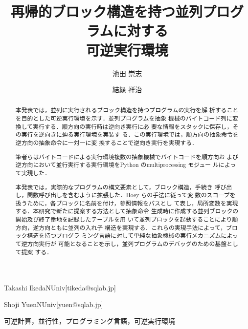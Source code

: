 \documentclass[submit,PRO]{ipsj}
\begin{document}
\title{再帰的ブロック構造を持つ並列プログラムに対する\\
      可逆実行環境}





\author{池田 崇志}{Takashi Ikeda}{NUniv}[tikeda@sqlab.jp]
\author{結縁 祥治}{Shoji Yuen}{NUniv}[yuen@sqlab.jp]


\begin{abstract}
本発表では，並列に実行されるブロック構造を持つプログラムの実行を解
析することを目的とした可逆実行環境を示す．並列プログラムを抽象
機械のバイトコード列に変換して実行する．順方向の実行時は逆向き実行に必
要な情報をスタックに保存し，その実行を逆向きに辿る実行環境を実装す
る．この実行環境では，順方向の抽象命令を逆方向の抽象命令に一対一に変
換することで逆向き実行を実現する．

筆者らはバイトコードによる実行環境複数の抽象機械でバイトコードを順方向お
よび逆方向において並行実行する実行環境をPython のmultiprocessing モジュー
ルによって実現した．

本発表では，実際的なプログラムの構文要素として，ブロック構造，手続き
呼び出し，関数呼び出しを含むように拡張した．Hoey らの手法に従って変
数のスコープを扱うために，各ブロックに名前を付け，参照情報をパスとし
て表し，局所変数を実現する．本研究で新たに提案する方法として抽象命令
生成時に作成する並列ブロックの開始及び終了番地を記録したテーブルを用
いて並列ブロックを起動することにより順方向，逆方向ともに並列の入れ子
構造を実現する．これらの実現手法によって，ブロック構造を持つプログラ
ミング言語に対して単純な抽象機械の実行メカニズムによって逆方向実行が
可能となることを示し，並列プログラムのデバッグのための基盤として提案
する．
\end{abstract}


\begin{jkeyword}
可逆計算，並行性，プログラミング言語，可逆実行環境
\end{jkeyword}
\end{document}
